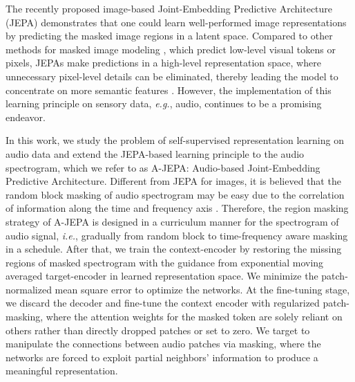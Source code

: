 \documentclass{article}
\begin{document}
The recently proposed image-based Joint-Embedding Predictive Architecture (JEPA) \cite{lecun2022path,assran2023self} demonstrates that one could learn well-performed image representations by predicting the masked image regions in a latent space.
Compared to other methods for masked image modeling \cite{he2022masked,fei2019fast,tong2022videomae,fei2022deecap,fei2020iterative,yan2021semi,feichtenhofer2022masked}, which predict low-level visual tokens or pixels, JEPAs make predictions in a high-level representation space, where unnecessary pixel-level details can be eliminated, thereby leading the model to concentrate on more semantic features \cite{assran2023self}. However, the implementation of this learning principle on sensory data, \emph{e.g.}, audio, continues to be a promising endeavor.


In this work, we study the problem of self-supervised representation learning on audio data and extend the JEPA-based learning principle to the audio spectrogram, which we refer to as A-JEPA: Audio-based Joint-Embedding Predictive Architecture. 
Different from JEPA for images, it is believed that the random block masking of audio spectrogram may be easy due to the correlation of information along the time and frequency axis \cite{tong2022videomae}. Therefore, the region masking strategy of A-JEPA is designed in a curriculum manner for the spectrogram of audio signal, \emph{i.e.}, gradually from random block to time-frequency aware masking in a schedule. 
After that, we train the context-encoder by restoring the missing regions of masked spectrogram with the guidance from exponential moving averaged target-encoder in learned representation space. 
We minimize the patch-normalized mean square error to optimize the networks. 
At the fine-tuning stage, we discard the decoder and fine-tune the context encoder with regularized patch-masking, where the attention weights for the masked token are solely reliant on others rather than directly dropped patches or set to zero. 
We target to manipulate the connections between audio patches via masking, where the networks are forced to exploit partial neighbors’ information to produce a meaningful representation. 
\end{document}
